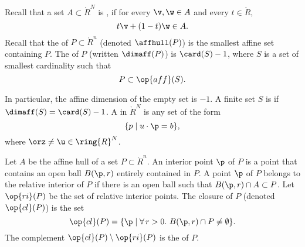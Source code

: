 \begin{definition}\label{def:affine}
Recall that a set $A\subset\ring{R}^N$ is , if for
every $\v,\w\in A$ and every $t \in \ring{R}$, 
\begin{displaymath}
  t \v + (1-t) \w \in A.
\end{displaymath}
Recall that
the  of $P\subset\ring{R}^n$ (denoted $\affhull(P)$) 
is the smallest affine set
containing $P$.  The  of $P$ (written $\dimaff(P)$) is
$\card(S)-1$, where $S$ is a set of smallest cardinality such that
\begin{displaymath}
P \subset \op{aff}(S).
\end{displaymath}
\end{definition}
In particular, the affine dimension of the empty set is $-1$.
A finite set $S$ is  if $\dimaff(S) = \card(S)-1$.
A  in $\ring{R}^N$ is any set of the form
\begin{displaymath}
\{p\mid u\cdot \p = b\},
\end{displaymath}
where $\orz\ne\u\in\ring{R}^N$.
%
%



\begin{definition}
Let
$A$ be the affine hull of a set $P\subset\ring{R}^n$.  An interior
point $\p$ of $P$ is a point that contains an open ball $B(\p,r)$
entirely contained in $P$.  A point $\p$ of $P$ belongs to the
relative interior of $P$ if there is an open ball such that $B(\p,r)
\cap A\subset P$.  Let $\op{ri}(P)$ be the set of relative interior
points.  The closure of $P$ (denoted $\op{cl}(P)$) is the set
\begin{displaymath}
\op{cl}(P) = \{\p \mid \forall\,r >0.~ B(\p,r) \cap P \ne \emptyset\}.
\end{displaymath}
The complement $\op{cl}(P)\setminus \op{ri}(P)$ is the
 of $P$.
\end{definition}
%
%
%
%
%
%
%

